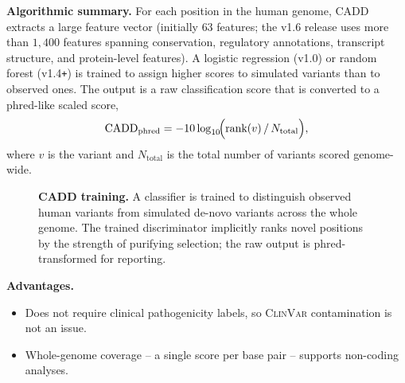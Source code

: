 \documentclass[11pt,a4paper,oneside]{report}
\begin{document}
\textbf{Algorithmic summary.} For each position in the
human genome, CADD extracts a large feature vector
(initially $63$ features; the v1.6 release uses more
than $1{,}400$ features spanning conservation,
regulatory annotations, transcript structure, and
protein-level features). A logistic regression (v1.0)
or random forest (v1.4\texttt{+}) is trained to assign
higher scores to simulated variants than to observed
ones. The output is a raw classification score that
is converted to a phred-like scaled score,
\[
\text{CADD}_{\text{phred}} = -10 \log_{10}\!
\Bigl( \text{rank}(v)\,/\,N_{\text{total}} \Bigr),
\]
where $v$ is the variant and $N_{\text{total}}$ is the
total number of variants scored genome-wide.

\begin{figure}[htbp]
\centering
{}
\caption[CADD pipeline]{\textbf{CADD training.} A classifier
is trained to distinguish observed human variants from
simulated de-novo variants across the whole genome. The
trained discriminator implicitly ranks novel positions by
the strength of purifying selection; the raw output is
phred-transformed for reporting.}
\label{fig:cadd-pipeline}
\end{figure}

\textbf{Advantages.}
\begin{itemize}[leftmargin=2em, itemsep=0.15em]
  \item Does not require clinical pathogenicity labels,
    so \textsc{ClinVar} contamination is not an issue.
  \item Whole-genome coverage -- a single score per
    base pair -- supports non-coding analyses.
\end{itemize}
\end{document}
